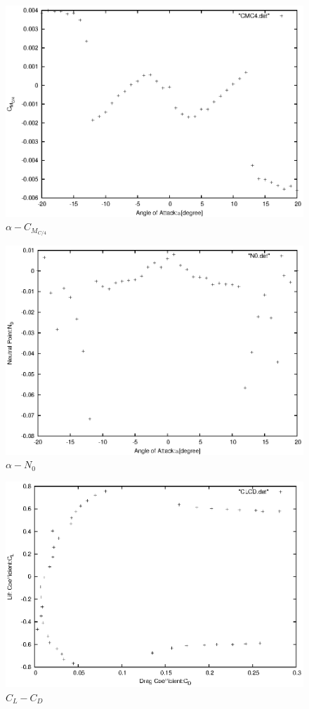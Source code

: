 \documentclass[a4j,twoside,openright,11pt]{jarticle}
\begin{document}
\begin{figure}[htbp]
\begin{center}
\includegraphics[width=12cm]{./CMC4/CMC4.eps}
\end{center}
\caption{$\alpha - C_{M_{C/4}}$}
\end{figure}

\begin{figure}[htbp]
\begin{center}
\includegraphics[width=12cm]{./N0/N0.eps}
\end{center}
\caption{$\alpha - N_0$}
\end{figure}

\begin{figure}[htbp]
\begin{center}
\includegraphics[width=12cm]{./CLCD/CLCD.eps}
\end{center}
\caption{$C_L - C_D$}
\end{figure}
\end{document}
